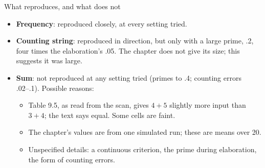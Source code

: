 \documentclass[aspectratio=169,11pt]{beamer}
\begin{document}
\begin{frame}{What reproduces, and what does not}
  \begin{itemize}
    \item \textbf{Frequency}: reproduced closely, at every setting tried.
    \item \textbf{Counting string}: reproduced in direction, but only with a large prime, .2, four times the elaboration's .05. The chapter does not give its size; this suggests it was large.
    \item \textbf{Sum}: not reproduced at any setting tried (primes to .4; counting errors .02--.1). Possible reasons:
    \begin{itemize}
      \item Table 9.5, as read from the scan, gives $4+5$ slightly more input than $3+4$; the text says equal. Some cells are faint.
      \item The chapter's values are from one simulated run; these are means over 20.
      \item Unspecified details: a continuous criterion, the prime during elaboration, the form of counting errors.
    \end{itemize}
  \end{itemize}
\end{frame}
\end{document}
